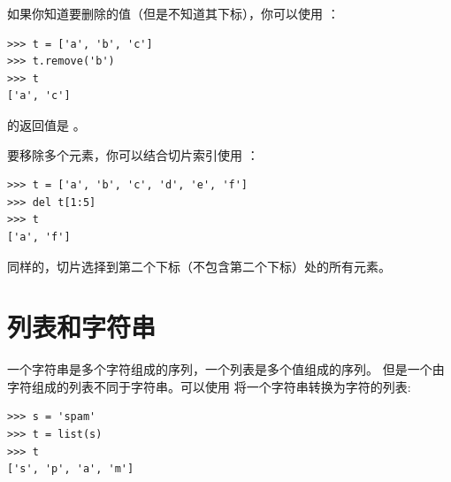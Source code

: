%

如果你知道要删除的值（但是不知道其下标），你可以使用  ：

  

\begin{lstlisting}
>>> t = ['a', 'b', 'c']
>>> t.remove('b')
>>> t
['a', 'c']
\end{lstlisting}
%

 的返回值是 。

  


要移除多个元素，你可以结合切片索引使用  ：

\begin{lstlisting}
>>> t = ['a', 'b', 'c', 'd', 'e', 'f']
>>> del t[1:5]
>>> t
['a', 'f']
\end{lstlisting}

%

同样的，切片选择到第二个下标（不包含第二个下标）处的所有元素。


\section{列表和字符串}
  


一个字符串是多个字符组成的序列，一个列表是多个值组成的序列。 但是一个由字符组成的列表不同于字符串。可以使用  将一个字符串转换为字符的列表:

  

\begin{lstlisting}
>>> s = 'spam'
>>> t = list(s)
>>> t
['s', 'p', 'a', 'm']
\end{lstlisting}

